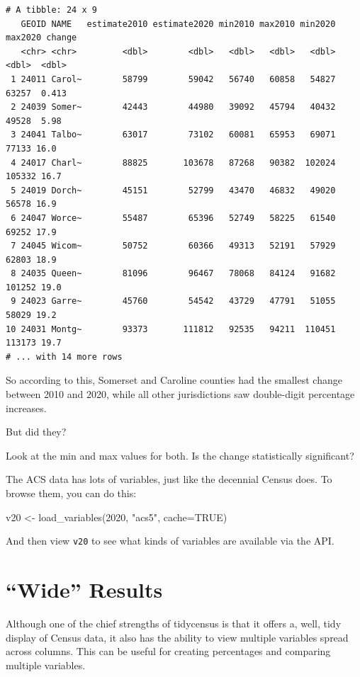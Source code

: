 \documentclass[
  letterpaper,
  DIV=11,
  numbers=noendperiod]{scrreprt}
\newenvironment{Shaded}{\begin{snugshade}}{\end{snugshade}}
\newcommand{\AttributeTok}[1]{\textcolor[rgb]{0.40,0.45,0.13}{#1}}
\newcommand{\ConstantTok}[1]{\textcolor[rgb]{0.56,0.35,0.01}{#1}}
\newcommand{\DecValTok}[1]{\textcolor[rgb]{0.68,0.00,0.00}{#1}}
\newcommand{\FunctionTok}[1]{\textcolor[rgb]{0.28,0.35,0.67}{#1}}
\newcommand{\NormalTok}[1]{\textcolor[rgb]{0.00,0.23,0.31}{#1}}
\newcommand{\OtherTok}[1]{\textcolor[rgb]{0.00,0.23,0.31}{#1}}
\newcommand{\StringTok}[1]{\textcolor[rgb]{0.13,0.47,0.30}{#1}}
\begin{document}
\begin{verbatim}
# A tibble: 24 x 9
   GEOID NAME   estimate2010 estimate2020 min2010 max2010 min2020 max2020 change
   <chr> <chr>         <dbl>        <dbl>   <dbl>   <dbl>   <dbl>   <dbl>  <dbl>
 1 24011 Carol~        58799        59042   56740   60858   54827   63257  0.413
 2 24039 Somer~        42443        44980   39092   45794   40432   49528  5.98 
 3 24041 Talbo~        63017        73102   60081   65953   69071   77133 16.0  
 4 24017 Charl~        88825       103678   87268   90382  102024  105332 16.7  
 5 24019 Dorch~        45151        52799   43470   46832   49020   56578 16.9  
 6 24047 Worce~        55487        65396   52749   58225   61540   69252 17.9  
 7 24045 Wicom~        50752        60366   49313   52191   57929   62803 18.9  
 8 24035 Queen~        81096        96467   78068   84124   91682  101252 19.0  
 9 24023 Garre~        45760        54542   43729   47791   51055   58029 19.2  
10 24031 Montg~        93373       111812   92535   94211  110451  113173 19.7  
# ... with 14 more rows
\end{verbatim}

So according to this, Somerset and Caroline counties had the smallest
change between 2010 and 2020, while all other jurisdictions saw
double-digit percentage increases.

But did they?

Look at the min and max values for both. Is the change statistically
significant?

The ACS data has lots of variables, just like the decennial Census does.
To browse them, you can do this:

\begin{Shaded}
\begin{Highlighting}[]
\NormalTok{v20 }\OtherTok{\textless{}{-}} \FunctionTok{load\_variables}\NormalTok{(}\DecValTok{2020}\NormalTok{, }\StringTok{"acs5"}\NormalTok{, }\AttributeTok{cache=}\ConstantTok{TRUE}\NormalTok{)}
\end{Highlighting}
\end{Shaded}

And then view \texttt{v20} to see what kinds of variables are available
via the API.

\hypertarget{wide-results}{%
\section{``Wide'' Results}\label{wide-results}}

Although one of the chief strengths of tidycensus is that it offers a,
well, tidy display of Census data, it also has the ability to view
multiple variables spread across columns. This can be useful for
creating percentages and comparing multiple variables.
\end{document}
